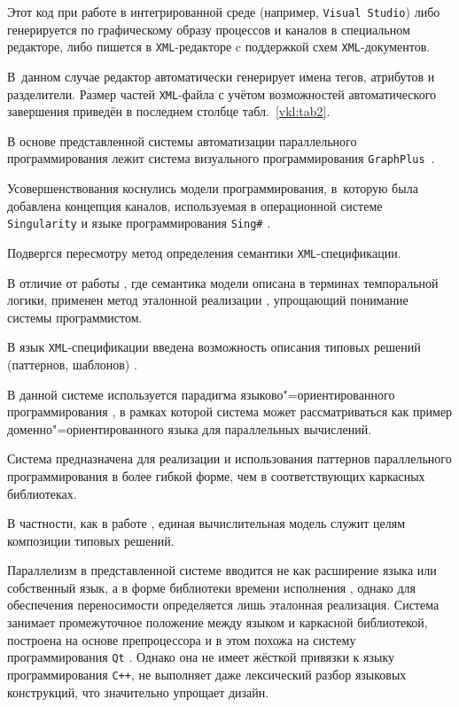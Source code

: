 Этот код при работе в интегрированной среде (например, {\tt Visual Studio}) либо генерируется по графическому образу процессов и каналов в специальном редакторе, либо пишется в {\tt XML}-редакторе c поддержкой схем {\tt XML}-документов. 

В~данном случае редактор автоматически генерирует имена тегов, атрибутов и разделители. Размер частей {\tt XML}-файла с учётом возможностей автоматического завершения приведён в последнем столбце табл.~\ref{vkl:tab2}.



В основе представленной системы автоматизации параллельного программирования лежит система визуального программирования {\tt GraphPlus}~\cite{vkl:bib:bib1}. 

Усовершенствования коснулись модели программирования, в~которую была добавлена концепция каналов, используемая в операционной системе {\tt Singu\-la\-rity} и языке программирования {\tt Sing\#} \cite{vkl:bib:bib2}. 

Подвергся пересмотру метод определения семантики {\tt XML}-спецификации. 

В отличие от работы \cite{vkl:bib:bib3}, где семантика модели описана в терминах темпоральной логики, применен метод эталонной реализации \cite{vkl:bib:bib4}, упрощающий понимание системы программистом. 

В язык {\tt XML}-спецификации введена возможность описания типовых решений (паттернов, шаблонов) \cite{vkl:bib:bib5}.



В данной системе используется парадигма языково"=ориентированного программирования \cite{vkl:bib:bib6}, в рамках которой система может рассматриваться как пример доменно"=ориентированного языка для параллельных вычислений. 

Система предназначена для реализации и использования паттернов параллельного программирования \cite{vkl:bib:bib7} в более гибкой форме, чем в соответствующих каркасных библиотеках. 

В частности, как в работе \cite{vkl:bib:bib8}, единая вычислительная модель служит целям композиции типовых решений. 

Параллелизм в представленной системе вводится не как расширение языка или собственный язык, а в форме библиотеки времени исполнения \cite{vkl:bib:bib9}, однако для обеспечения переносимости определяется лишь эталонная реализация. Система занимает промежуточное положение между языком и каркасной библиотекой, построена на основе препроцессора и в этом похожа на систему программирования {\tt Qt} \cite{vkl:bib:bib10}. Однако она не имеет жёсткой привязки к языку программирования {\tt C++}, не выполняет даже лексический разбор языковых конструкций, что значительно упрощает дизайн.



